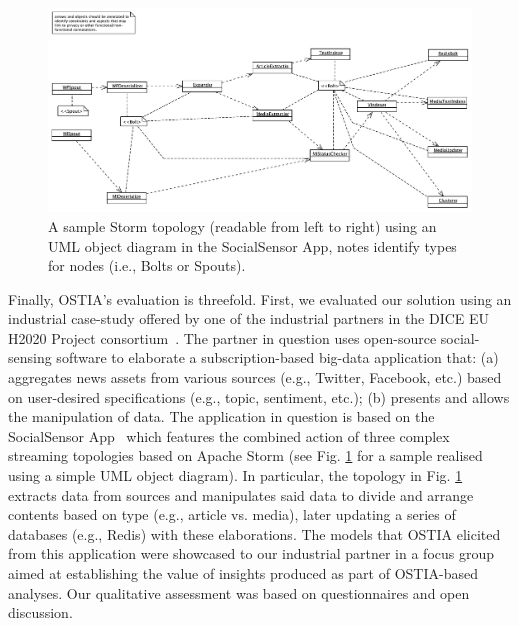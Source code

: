 \begin{figure}
  \centering
  \includegraphics[width=12cm]{images/socialsensorother}
  \caption{A sample Storm topology (readable from left to right) using an UML object diagram in the SocialSensor App, notes identify types for nodes (i.e., Bolts or Spouts).}
  \label{socialsensor-topology}
\end{figure}

Finally, OSTIA's evaluation is threefold.  First, we evaluated our solution
using an industrial case-study offered by one of the industrial partners in the
DICE EU H2020 Project consortium~\cite{dice2020}.
The
partner in question uses open-source social-sensing software to elaborate a
subscription-based big-data application that: (a) aggregates news assets from
various sources (e.g., Twitter, Facebook, etc.) based on user-desired
specifications (e.g., topic, sentiment, etc.); (b) presents and allows the
manipulation of data. The application in question is based on the SocialSensor
App~\cite{socialsensor}
which features the combined
action of three complex streaming topologies based on Apache Storm (see
Fig. \ref{socialsensor-topology} for a sample realised using a simple UML object diagram).  In particular, the topology in
Fig. \ref{socialsensor-topology} extracts data from sources and manipulates said
data to divide and arrange contents based on type (e.g., article vs. media),
later updating a series of databases (e.g., Redis) with these elaborations. The
models that OSTIA elicited from this application were showcased to our
industrial partner in a focus group aimed at establishing the value of insights
produced as part of OSTIA-based analyses. Our qualitative assessment was based
on questionnaires and open discussion.

